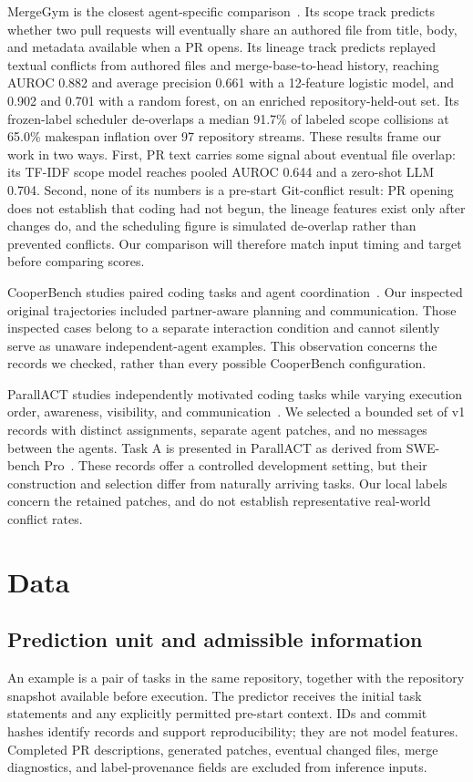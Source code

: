 \documentclass[sigconf,authorversion,nonacm]{acmart}
\begin{document}
MergeGym is the closest agent-specific comparison~\cite{mergegym2026}. Its scope track predicts whether two pull requests will eventually share an authored file from title, body, and metadata available when a PR opens. Its lineage track predicts replayed textual conflicts from authored files and merge-base-to-head history, reaching AUROC 0.882 and average precision 0.661 with a 12-feature logistic model, and 0.902 and 0.701 with a random forest, on an enriched repository-held-out set. Its frozen-label scheduler de-overlaps a median 91.7\% of labeled scope collisions at 65.0\% makespan inflation over 97 repository streams. These results frame our work in two ways. First, PR text carries some signal about eventual file overlap: its TF-IDF scope model reaches pooled AUROC 0.644 and a zero-shot LLM 0.704. Second, none of its numbers is a pre-start Git-conflict result: PR opening does not establish that coding had not begun, the lineage features exist only after changes do, and the scheduling figure is simulated de-overlap rather than prevented conflicts. Our comparison will therefore match input timing and target before comparing scores.

CooperBench studies paired coding tasks and agent coordination~\cite{cooperbench2026}. Our inspected original trajectories included partner-aware planning and communication. Those inspected cases belong to a separate interaction condition and cannot silently serve as unaware independent-agent examples. This observation concerns the records we checked, rather than every possible CooperBench configuration.

ParallACT studies independently motivated coding tasks while varying execution order, awareness, visibility, and communication~\cite{parallact2026}. We selected a bounded set of v1 records with distinct assignments, separate agent patches, and no messages between the agents. Task A is presented in ParallACT as derived from SWE-bench Pro~\cite{swebenchpro}. These records offer a controlled development setting, but their construction and selection differ from naturally arriving tasks. Our local labels concern the retained patches, and do not establish representative real-world conflict rates.

\section{Data}
\subsection{Prediction unit and admissible information}
An example is a pair of tasks in the same repository, together with the repository snapshot available before execution. The predictor receives the initial task statements and any explicitly permitted pre-start context. IDs and commit hashes identify records and support reproducibility; they are not model features. Completed PR descriptions, generated patches, eventual changed files, merge diagnostics, and label-provenance fields are excluded from inference inputs.
\end{document}
